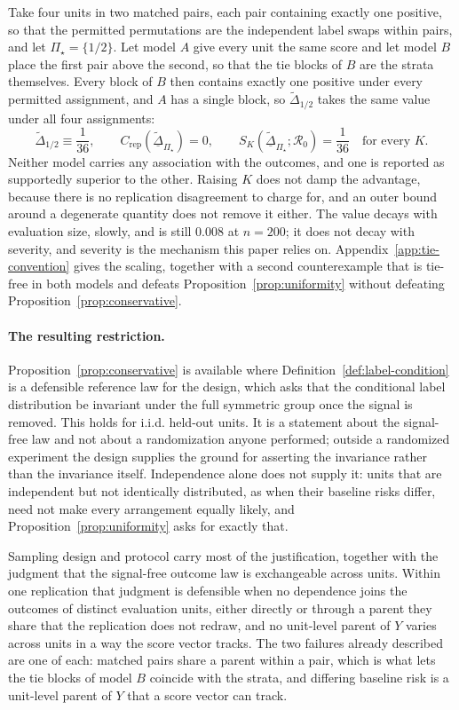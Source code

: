 \documentclass[11pt]{article}
\newcommand{\Regime}{\mathcal{R}}
\newcommand{\PSet}{\Pi_\star}
\newcommand{\Dta}{\widetilde{\Delta}}
\newcommand{\RobDta}{\underline{\widetilde{\Delta}}_{\PSet}}
\theoremstyle{remark}
\begin{document}
Take four units in two matched pairs, each pair containing exactly one positive, so that the permitted permutations are the independent label swaps within pairs, and let $\PSet=\{1/2\}$. Let model $A$ give every unit the same score and let model $B$ place the first pair above the second, so that the tie blocks of $B$ are the strata themselves. Every block of $B$ then contains exactly one positive under every permitted assignment, and $A$ has a single block, so $\Dta_{1/2}$ takes the same value under all four assignments:
\[
\Dta_{1/2}\equiv\frac{1}{36},
\qquad
C_{\mathrm{rep}}(\RobDta)=0,
\qquad
S_K(\RobDta;\Regime_0)=\frac{1}{36}
\quad\text{for every }K .
\]
Neither model carries any association with the outcomes, and one is reported as supportedly superior to the other. Raising $K$ does not damp the advantage, because there is no replication disagreement to charge for, and an outer bound around a degenerate quantity does not remove it either. The value decays with evaluation size, slowly, and is still $0.008$ at $n=200$; it does not decay with severity, and severity is the mechanism this paper relies on. Appendix~\ref{app:tie-convention} gives the scaling, together with a second counterexample that is tie-free in both models and defeats Proposition~\ref{prop:uniformity} without defeating Proposition~\ref{prop:conservative}.

\paragraph{The resulting restriction.}
Proposition~\ref{prop:conservative} is available where Definition~\ref{def:label-condition} is a defensible reference law for the design, which asks that the conditional label distribution be invariant under the full symmetric group once the signal is removed. This holds for i.i.d. held-out units. It is a statement about the signal-free law and not about a randomization anyone performed; outside a randomized experiment the design supplies the ground for asserting the invariance rather than the invariance itself. Independence alone does not supply it: units that are independent but not identically distributed, as when their baseline risks differ, need not make every arrangement equally likely, and Proposition~\ref{prop:uniformity} asks for exactly that.

Sampling design and protocol carry most of the justification, together with the judgment that the signal-free outcome law is exchangeable across units. Within one replication that judgment is defensible when no dependence joins the outcomes of distinct evaluation units, either directly or through a parent they share that the replication does not redraw, and no unit-level parent of $Y$ varies across units in a way the score vector tracks. The two failures already described are one of each: matched pairs share a parent within a pair, which is what lets the tie blocks of model $B$ coincide with the strata, and differing baseline risk is a unit-level parent of $Y$ that a score vector can track.
\end{document}
